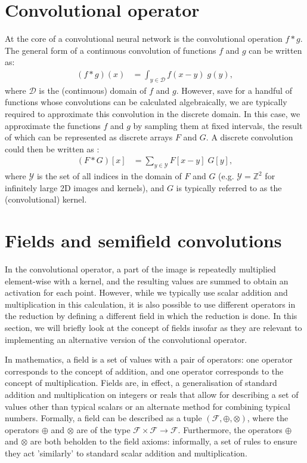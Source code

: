 \documentclass[a4paper, 12pt]{report}
\begin{document}
\section{Convolutional operator}
At the core of a convolutional neural network is the convolutional operation $f*g$. The general form of a continuous convolution of functions $f$ and $g$ can be written as:
\begin{align}
(f*g)(x) &= \int_{y\in\mathcal{D}} f(x-y)\; g(y)	,
\end{align}
where $\mathcal{D}$ is the (continuous) domain of $f$ and $g$. However, save for a handful of functions whose convolutions can be calculated algebraically, we are typically required to approximate this convolution in the discrete domain. In this case, we approximate the functions $f$ and $g$ by sampling them at fixed intervals, the result of which can be represented as discrete arrays $F$ and $G$. A discrete convolution could then be written as \cite{szeliski2022computer}:
\begin{align}
(F*G)[x] &= \sum_{y\in\mathcal{Y}} F[x-y]\; G[y],
\end{align}
where $\mathcal{Y}$ is the set of all indices in the domain of $F$ and $G$ (e.g. $\mathcal{Y}=\mathbb{Z}^2$ for infinitely large 2D images and kernels), and $G$ is typically referred to as the (convolutional) kernel.


\section{Fields and semifield convolutions}
In the convolutional operator, a part of the image is repeatedly multiplied element-wise with a kernel, and the resulting values are summed to obtain an activation for each point. However, while we typically use scalar addition and multiplication in this calculation, it is also possible to use different operators in the reduction by defining a different field in which the reduction is done. In this section, we will briefly look at the concept of fields insofar as they are relevant to implementing an alternative version of the convolutional operator.

In mathematics, a field is a set of values with a pair of operators: one operator corresponds to the concept of addition, and one operator corresponds to the concept of multiplication. Fields are, in effect, a generalisation of standard addition and multiplication on integers or reals that allow for describing a set of values other than typical scalars or an alternate method for combining typical numbers. Formally, a field can be described as a tuple $(\mathcal{F}, \oplus, \otimes)$, where the operators $\oplus$ and $\otimes$ are of the type $\mathcal{F}\times\mathcal{F}\rightarrow\mathcal{F}$. Furthermore, the operators $\oplus$ and $\otimes$ are both beholden to the field axioms: informally, a set of rules to ensure they act 'similarly' to standard scalar addition and multiplication. 
\end{document}
